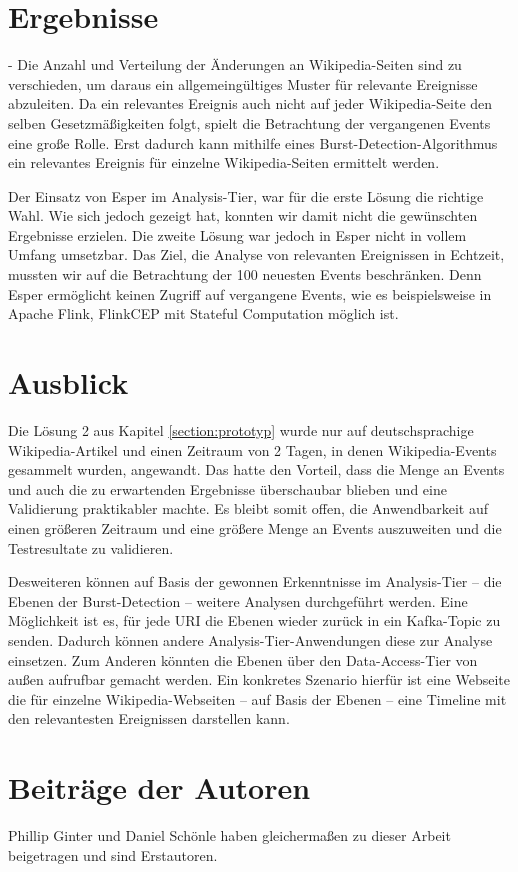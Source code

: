 \section{Ergebnisse}
- Die Anzahl und Verteilung der Änderungen an Wikipedia-Seiten sind zu verschieden, um daraus ein allgemeingültiges Muster für relevante Ereignisse abzuleiten.
Da ein relevantes Ereignis auch nicht auf jeder Wikipedia-Seite den selben Gesetzmäßigkeiten folgt, spielt die Betrachtung der vergangenen Events eine große Rolle.
Erst dadurch kann mithilfe eines Burst-Detection-Algorithmus ein relevantes Ereignis für einzelne Wikipedia-Seiten ermittelt werden.

Der Einsatz von Esper im Analysis-Tier, war für die erste Lösung die richtige Wahl. Wie sich jedoch gezeigt hat, konnten wir damit
nicht die gewünschten Ergebnisse erzielen. Die zweite Lösung war jedoch in Esper nicht in vollem Umfang umsetzbar.
Das Ziel, die Analyse von relevanten Ereignissen in Echtzeit, mussten wir auf die Betrachtung der 100 neuesten Events beschränken.
Denn Esper ermöglicht keinen Zugriff auf vergangene Events, wie es beispielsweise in Apache Flink, FlinkCEP mit Stateful Computation möglich ist\cite{Friedman:2016:IAF:3126171}.

\section{Ausblick}
Die Lösung 2 aus Kapitel \ref{section:prototyp} wurde nur auf deutschsprachige Wikipedia-Artikel und einen Zeitraum von 2 Tagen, in denen Wikipedia-Events gesammelt wurden, angewandt.
Das hatte den Vorteil, dass die Menge an Events und auch die zu erwartenden Ergebnisse überschaubar blieben und eine Validierung praktikabler machte.
Es bleibt somit offen, die Anwendbarkeit auf einen größeren Zeitraum und eine größere Menge an Events auszuweiten und die Testresultate zu validieren.

Desweiteren können auf Basis der gewonnen Erkenntnisse im Analysis-Tier -- die Ebenen der Burst-Detection -- weitere Analysen durchgeführt werden.
Eine Möglichkeit ist es, für jede URI die Ebenen wieder zurück in ein Kafka-Topic zu senden. Dadurch können andere Analysis-Tier-Anwendungen diese zur Analyse einsetzen.
Zum Anderen könnten die Ebenen über den Data-Access-Tier von außen aufrufbar gemacht werden. Ein konkretes Szenario hierfür ist eine Webseite
die für einzelne Wikipedia-Webseiten -- auf Basis der Ebenen -- eine Timeline mit den relevantesten Ereignissen darstellen kann.

\section{Beiträge der Autoren}
 Phillip Ginter und Daniel Schönle haben gleichermaßen zu dieser Arbeit beigetragen und sind Erstautoren.
